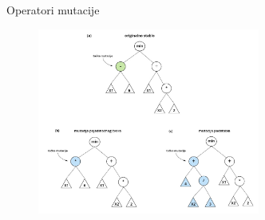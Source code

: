 \documentclass{beamer}
\begin{document}

\begin{frame}{Operatori mutacije}
\begin{enumerate}

\begin{figure}[!ht]
\begin{center}
\includegraphics[width=0.65\textwidth]{images/mutation4.jpg}
\end{center}
\label{fig:mutation}
\end{figure}

\end{enumerate}
\end{frame}
\end{document}
